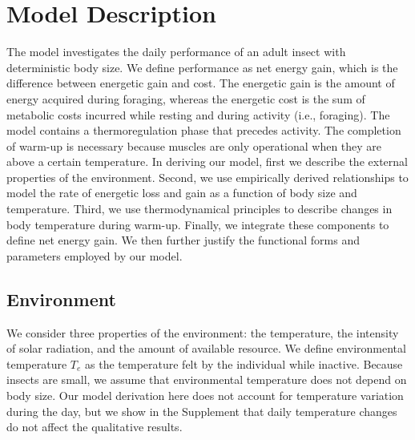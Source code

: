 \section*{Model Description} %
The model investigates the daily performance of an adult insect with deterministic body size. %
We define performance as net energy gain, which is the difference between energetic gain and cost. %
The energetic gain is the amount of energy acquired during foraging, whereas  the energetic cost is the sum of metabolic costs incurred while resting and during activity (i.e., foraging).
The model contains a thermoregulation phase that precedes activity.
The completion of warm-up is necessary because muscles are only operational when they are above a certain temperature. %
In deriving our model, first we describe the external properties of the environment.
Second, we use empirically derived relationships to model the rate of energetic loss and gain as a function of body size and temperature.
Third, we use thermodynamical principles to describe changes in body temperature during warm-up.
Finally, we integrate these components to define net energy gain. 
We then further justify the functional forms and parameters employed by our model.

\subsection*{Environment}
We consider three properties of the environment: the temperature, the intensity of solar radiation, and the amount of available resource.
We define environmental temperature $T_e$ as the temperature felt by the individual while inactive.
Because insects are small, we assume that environmental temperature does not depend on body size. %
Our model derivation here does not account for temperature variation during the day, but we show in the Supplement that daily temperature changes do not affect the qualitative results.  


